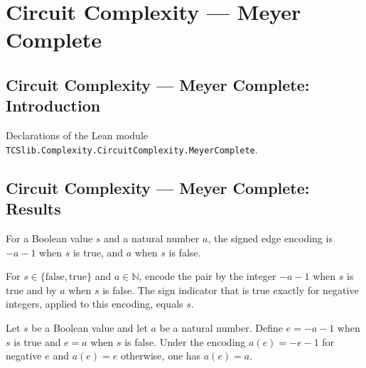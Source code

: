 \section{Circuit Complexity --- Meyer Complete}
\subsection*{Circuit Complexity --- Meyer Complete: Introduction}

Declarations of the Lean module \texttt{TCSlib.Complexity.CircuitComplexity.MeyerComplete}.

\subsection*{Circuit Complexity --- Meyer Complete: Results}

\begin{definition}
\label{Complexity.Meyer.edgeOf}
\leanok
For a Boolean value $s$ and a natural number $a$, the signed edge encoding is $-a-1$
when $s$ is true, and $a$ when $s$ is false.
\end{definition}

\begin{theorem}
\label{Complexity.Meyer.sE_edgeOf}
\leanok
{}
For $s\in\{\mathrm{false},\mathrm{true}\}$ and $a\in\mathbb{N}$, encode the pair by the
integer $-a-1$ when $s$ is true and by $a$ when $s$ is false. The sign indicator that is
true exactly for negative integers, applied to this encoding, equals $s$.
\end{theorem}

\begin{theorem}
\label{Complexity.Meyer.aE_edgeOf}
\leanok
{}
Let $s$ be a Boolean value and let $a$ be a natural number. Define $e=-a-1$ when $s$ is
true and $e=a$ when $s$ is false. Under the encoding $a(e)=-e-1$ for negative $e$ and
$a(e)=e$ otherwise, one has $a(e)=a$.
\end{theorem}


